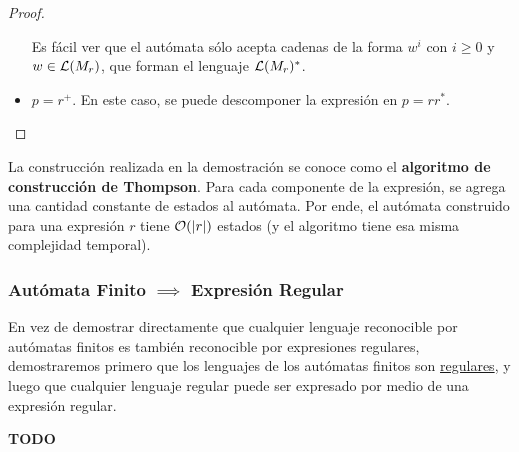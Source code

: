 \begin{proof}
\begin{itemize}
\begin{figure}[H]
              \end{figure}

              Es fácil ver que el autómata sólo acepta cadenas de la forma $w^i$ con $i \geq 0$ y $w \in \mathcal{L}(M_r)$, que forman el lenguaje $\mathcal{L}(M_r)^*$.

        \item $p = r^+$. En este caso, se puede descomponer la expresión en $p = rr^*$.
    \end{itemize}
\end{proof}

La construcción realizada en la demostración se conoce como el \textbf{algoritmo de construcción de Thompson}. Para cada componente de la expresión, se agrega una cantidad constante de estados al autómata. Por ende, el autómata construido para una expresión $r$ tiene $\mathcal{O}(|r|)$ estados (y el algoritmo tiene esa misma complejidad temporal).

\subsubsection{Autómata Finito $\implies$ Expresión Regular}

En vez de demostrar directamente que cualquier lenguaje reconocible por autómatas finitos es también reconocible por expresiones regulares, demostraremos primero que los lenguajes de los autómatas finitos son \hyperref[lenguaje-regular]{regulares}, y luego que cualquier lenguaje regular puede ser expresado por medio de una expresión regular.

\textbf{TODO}
